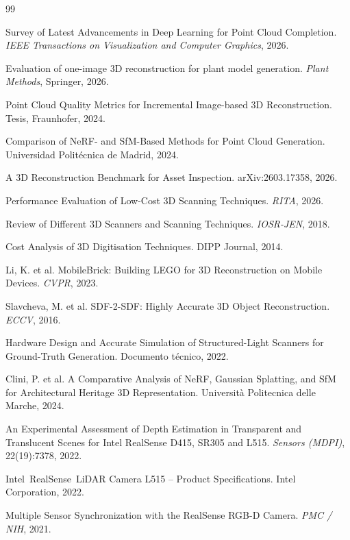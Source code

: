 \documentclass[11pt]{article}
\begin{document}
\begin{thebibliography}{99}

Survey of Latest Advancements in Deep Learning for Point Cloud Completion. \emph{IEEE Transactions on Visualization and Computer Graphics}, 2026.

Evaluation of one-image 3D reconstruction for plant model generation. \emph{Plant Methods}, Springer, 2026.

Point Cloud Quality Metrics for Incremental Image-based 3D Reconstruction. Tesis, Fraunhofer, 2024.

Comparison of NeRF- and SfM-Based Methods for Point Cloud Generation. Universidad Polit\'ecnica de Madrid, 2024.

A 3D Reconstruction Benchmark for Asset Inspection. arXiv:2603.17358, 2026.

Performance Evaluation of Low-Cost 3D Scanning Techniques. \emph{RITA}, 2026.

Review of Different 3D Scanners and Scanning Techniques. \emph{IOSR-JEN}, 2018.

Cost Analysis of 3D Digitisation Techniques. DIPP Journal, 2014.

Li, K. et al. MobileBrick: Building LEGO for 3D Reconstruction on Mobile Devices. \emph{CVPR}, 2023.

Slavcheva, M. et al. SDF-2-SDF: Highly Accurate 3D Object Reconstruction. \emph{ECCV}, 2016.

Hardware Design and Accurate Simulation of Structured-Light Scanners for Ground-Truth Generation. Documento t\'ecnico, 2022.

Clini, P. et al. A Comparative Analysis of NeRF, Gaussian Splatting, and SfM for Architectural Heritage 3D Representation. Universit\`a Politecnica delle Marche, 2024.

An Experimental Assessment of Depth Estimation in Transparent and Translucent Scenes for Intel RealSense D415, SR305 and L515. \emph{Sensors (MDPI)}, 22(19):7378, 2022.

Intel\textregistered\ RealSense\texttrademark\ LiDAR Camera L515 -- Product Specifications. Intel Corporation, 2022.

Multiple Sensor Synchronization with the RealSense RGB-D Camera. \emph{PMC / NIH}, 2021.

\end{thebibliography}
\end{document}
